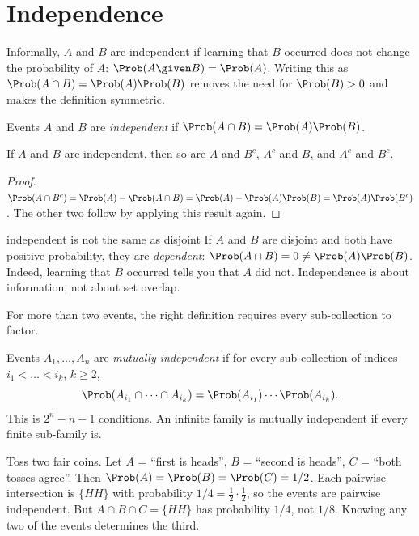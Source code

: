 \section{Independence}

Informally, $A$ and $B$ are independent if learning that $B$ occurred does not
change the probability of $A$: $\Prob(A\given B)=\Prob(A)$. Writing this as
$\Prob(A\cap B)=\Prob(A)\Prob(B)$ removes the need for $\Prob(B)>0$ and makes the
definition symmetric.

\begin{definition}
Events $A$ and $B$ are \emph{independent} if $\Prob(A\cap B)=\Prob(A)\Prob(B)$.
\end{definition}

\begin{proposition}\label{prop:indcomp}
If $A$ and $B$ are independent, then so are $A$ and $B^c$, $A^c$ and $B$, and
$A^c$ and $B^c$.
\end{proposition}
\begin{proof}
$\Prob(A\cap B^c)=\Prob(A)-\Prob(A\cap B)=\Prob(A)-\Prob(A)\Prob(B)
=\Prob(A)\Prob(B^c)$. The other two follow by applying this result again.
\end{proof}

\begin{pitfall}{independent is not the same as disjoint}
If $A$ and $B$ are disjoint and both have positive probability, they are
\emph{dependent}: $\Prob(A\cap B)=0\ne\Prob(A)\Prob(B)$. Indeed, learning that
$B$ occurred tells you that $A$ did not. Independence is about information, not
about set overlap.
\end{pitfall}

For more than two events, the right definition requires every sub-collection to
factor.

\begin{definition}
Events $A_1,\dots,A_n$ are \emph{mutually independent} if for every
sub-collection of indices $i_1<\dots<i_k$, $k\ge2$,
\[
\Prob(A_{i_1}\cap\dots\cap A_{i_k})=\Prob(A_{i_1})\cdots\Prob(A_{i_k}).
\]
This is $2^n-n-1$ conditions. An infinite family is mutually independent if
every finite sub-family is.
\end{definition}

\begin{example}\label{ex:pairwise}
Toss two fair coins. Let $A$ = ``first is heads'', $B$ = ``second is heads'',
$C$ = ``both tosses agree''. Then $\Prob(A)=\Prob(B)=\Prob(C)=1/2$. Each pairwise
intersection is $\{HH\}$ with probability $1/4=\frac12\cdot\frac12$, so the events
are pairwise independent. But $A\cap B\cap C=\{HH\}$ has probability $1/4$, not
$1/8$. Knowing any two of the events determines the third.
\end{example}

